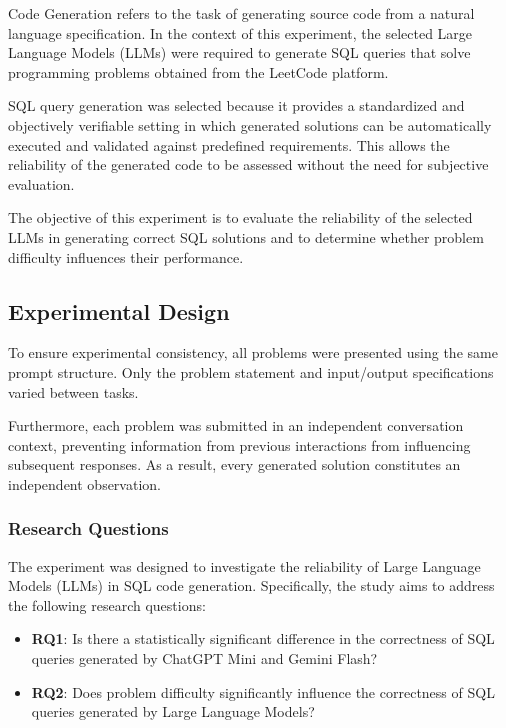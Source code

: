 \documentclass[11pt,a4paper]{article}
\begin{document}
   Code Generation refers to the task of generating source code from a natural language specification. In the context of this experiment, the selected Large Language Models (LLMs) were required to generate SQL queries that solve programming problems obtained from the LeetCode platform.

    SQL query generation was selected because it provides a standardized and objectively verifiable setting in which generated solutions can be automatically executed and validated against predefined requirements. This allows the reliability of the generated code to be assessed without the need for subjective evaluation.

    The objective of this experiment is to evaluate the reliability of the selected LLMs in generating correct SQL solutions and to determine whether problem difficulty influences their performance.

    \subsection{Experimental Design}

    To ensure experimental consistency, all problems were presented using the same prompt structure. Only the problem statement and input/output specifications varied between tasks.

    Furthermore, each problem was submitted in an independent conversation context, preventing information from previous interactions from influencing subsequent responses. As a result, every generated solution constitutes an independent observation.
    \subsubsection{Research Questions}

    The experiment was designed to investigate the reliability of Large Language Models (LLMs) in SQL code generation. Specifically, the study aims to address the following research questions:

    \begin{itemize}
        \item \textbf{RQ1}: Is there a statistically significant difference in the correctness of SQL queries generated by ChatGPT Mini and Gemini Flash?
        
        \item \textbf{RQ2}: Does problem difficulty significantly influence the correctness of SQL queries generated by Large Language Models?
    \end{itemize}
\end{document}
